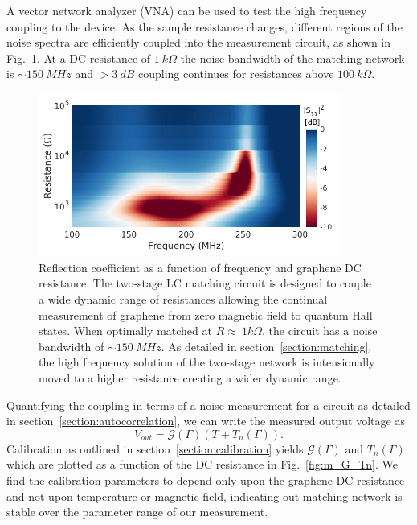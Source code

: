 A vector network analyzer (VNA) can be used to test the high frequency coupling to the device. As the sample resistance changes, different regions of the noise spectra are efficiently coupled into the measurement circuit, as shown in Fig.~\ref{fig:m_S11}. At a DC resistance of $1~k\Omega$ the noise bandwidth of the matching network is ${\sim}150~MHz$ and $>3~dB$ coupling continues for resistances above $100~k\Omega$.
\begin{figure}
\centering
\includegraphics[width=100mm]{figures/magneto/S11_plot.png}
\caption{Reflection coefficient as a function of frequency and graphene DC resistance. The two-stage LC matching circuit is designed to couple a wide dynamic range of resistances allowing the continual measurement of graphene from zero magnetic field to quantum Hall states. When optimally matched at $R\approx~1k\Omega$, the circuit has a noise bandwidth of ${\sim}150~MHz$. As detailed in section~\ref{section:matching}, the high frequency solution of the two-stage network is intensionally moved to a higher resistance creating a wider dynamic range.
}
\label{fig:m_S11}
\end{figure}
Quantifying the coupling in terms of a noise measurement for a circuit as detailed in section~\ref{section:autocorrelation}, we can write the measured output voltage as
\begin{equation}\label{eq:Vout_G_Tn}
V_{out} = \mathcal{G}(\Gamma)(T+T_n(\Gamma)).
\end{equation}
Calibration as outlined in section~\ref{section:calibration} yields $\mathcal{G}(\Gamma)$ and $T_n(\Gamma)$ which are plotted as a function of the DC resistance in Fig.~\ref{fig:m_G_Tn}. We find the calibration parameters to depend only upon the graphene DC resistance and not upon temperature or magnetic field, indicating out matching network is stable over the parameter range of our measurement.
